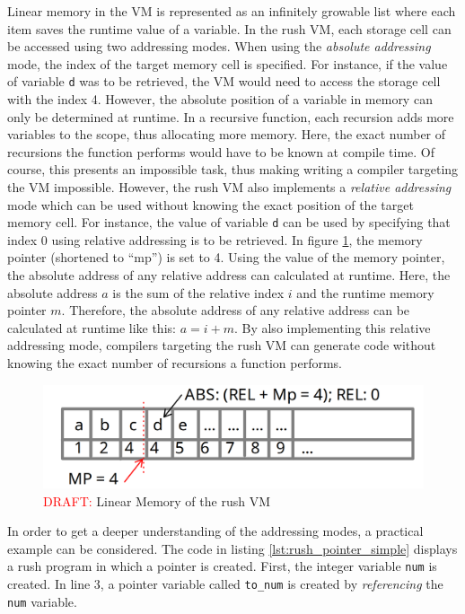 Linear memory in the VM is represented as an infinitely growable list where each item saves the runtime value of a variable.
In the rush VM, each storage cell can be accessed using two addressing modes.
When using the \emph{absolute addressing} mode, the index of the target memory cell is specified.
For instance, if the value of variable \texttt{d} was to be retrieved, the VM would need to access the storage cell with the index 4.
However, the absolute position of a variable in memory can only be determined at runtime.
In a recursive function, each recursion adds more variables to the scope, thus allocating more memory.
Here, the exact number of recursions the function performs would have to be known at compile time.
Of course, this presents an impossible task, thus making writing a compiler targeting the VM impossible.
However, the rush VM also implements a \emph{relative addressing} mode which can be used without knowing the exact position of the target memory cell.
For instance, the value of variable \texttt{d} can be used by specifying that index 0 using relative addressing is to be retrieved.
In figure \ref{fig:rush_vm_linmem}, the memory pointer (shortened to \enquote{mp}) is set to 4.
Using the value of the memory pointer, the absolute address of any relative address can calculated at runtime.
Here, the absolute address $a$ is the sum of the relative index $i$ and the runtime memory pointer $m$.
Therefore, the absolute address of any relative address can be calculated at runtime like this: $a = i + m$.
By also implementing this relative addressing mode,
compilers targeting the rush VM can generate code without knowing the exact number of recursions a function performs.

\begin{figure}[h]
	\includegraphics[width=\textwidth]{./vm_linmem_draft.png}
	\caption{\textcolor{red}{DRAFT:} Linear Memory of the rush VM}
	\label{fig:rush_vm_linmem}
\end{figure}

In order to get a deeper understanding of the addressing modes, a practical example can be considered.
The code in listing \ref{lst:rush_pointer_simple} displays a rush program in which a pointer is created.
First, the integer variable \texttt{num} is created.
In line 3, a pointer variable called \texttt{to\_num} is created by \emph{referencing} the \texttt{num} variable.

